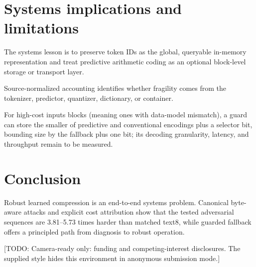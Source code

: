 \documentclass{article}
\newcommand{\todo}[1]{\textcolor{blueprint}{[TODO: #1]}}
\begin{document}
\section{Systems implications and limitations}

\label{sec:limitations}

The systems lesson is to preserve token IDs as the global, queryable in-memory representation and treat predictive arithmetic coding as an optional block-level storage or transport layer. 

Source-normalized accounting identifies whether fragility comes from the tokenizer, predictor, quantizer, dictionary, or container.

For high-cost inputs blocks (meaning ones with data-model mismatch), a guard can store the smaller of predictive and conventional encodings plus a selector bit, bounding size by the fallback plus one bit; its decoding granularity, latency, and throughput remain to be measured.



\section{Conclusion}

Robust learned compression is an end-to-end systems problem. Canonical byte-aware attacks and explicit cost attribution show that the tested adversarial sequences are 3.81--5.73 times harder than matched text8, while guarded fallback offers a principled path from diagnosis to robust operation.

\begin{ack}

\todo{Camera-ready only: funding and competing-interest disclosures. The supplied style hides this environment in anonymous submission mode.}

\end{ack}




\newpage

\end{document}
